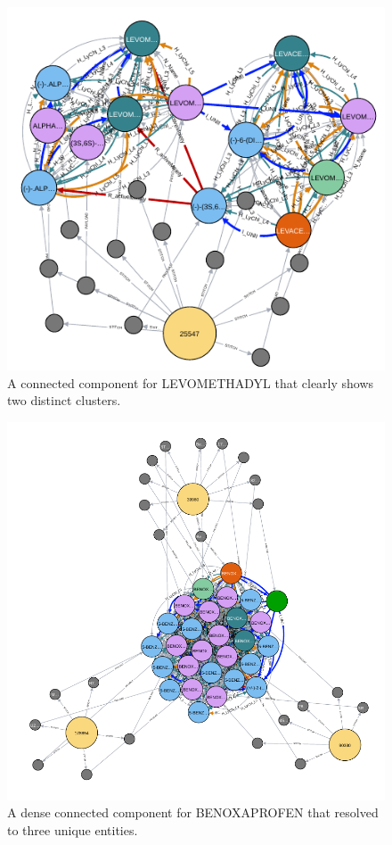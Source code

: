 \documentclass{bmcart}
\begin{document}
\begin{backmatter}
\begin{figure}[ht!]
  \caption{A connected component for LEVOMETHADYL that clearly shows two
    distinct clusters.}\label{fig:LEVOMETHADYL}  
  \centerline{\includegraphics[scale=0.5]{graph6-crop}}
\end{figure}

\begin{figure}[ht!]
  \caption{A dense connected component for BENOXAPROFEN that resolved to
    three unique entities.}\label{fig:BENOXAPROFEN}
  \centerline{\includegraphics[scale=0.5]{graph4-crop}}
\end{figure}


\end{backmatter}
\end{document}
